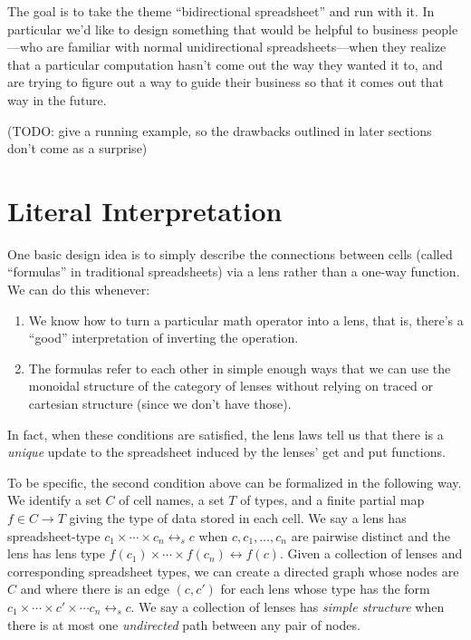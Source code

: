 \documentclass{article}
\newcommand{\lens}{\leftrightarrow}
\newcommand{\slens}{\lens_s}
\begin{document}
The goal is to take the theme ``bidirectional spreadsheet'' and run with it.
In particular we'd like to design something that would be helpful to
business people---who are familiar with normal unidirectional
spreadsheets---when they realize that a particular computation hasn't come
out the way they wanted it to, and are trying to figure out a way to guide
their business so that it comes out that way in the future.

(TODO: give a running example, so the drawbacks outlined in later sections
don't come as a surprise)

\section{Literal Interpretation}
\label{sec:naive}
One basic design idea is to simply describe the connections between cells
(called ``formulas'' in traditional spreadsheets) via a lens rather than a
one-way function. We can do this whenever:

\begin{enumerate}
    \item We know how to turn a particular math operator into a lens, that
        is, there's a ``good'' interpretation of inverting the operation.
    \item The formulas refer to each other in simple enough ways that we
        can use the monoidal structure of the category of lenses without
        relying on traced or cartesian structure (since we don't have
        those).
\end{enumerate}

In fact, when these conditions are satisfied, the lens laws tell us that
there is a \emph{unique} update to the spreadsheet induced by the lenses'
get and put functions.

To be specific, the second condition above can be formalized in the
following way. We identify a set $C$ of cell names, a set $T$ of types, and
a finite partial map $f \in C \to T$ giving the type of data stored in each
cell. We say a lens has spreadsheet-type $c_1 \times \cdots \times c_n
\slens c$ when $c, c_1, \ldots, c_n$ are pairwise distinct and the lens has
lens type $f(c_1) \times \cdots \times f(c_n) \lens f(c)$. Given a
collection of lenses and corresponding spreadsheet types, we can create a
directed graph whose nodes are $C$ and where there is an edge $(c,c')$ for
each lens whose type has the form $c_1 \times \cdots \times c' \times \cdots
c_n \slens c$. We say a collection of lenses has \emph{simple structure}
when there is at most one \emph{undirected} path between any pair of nodes.
\end{document}
